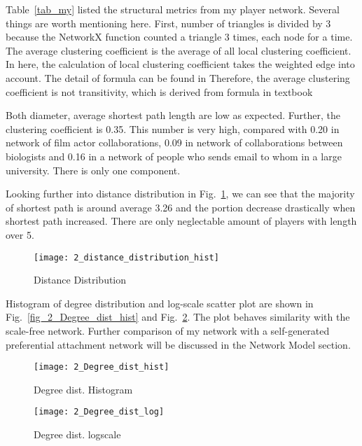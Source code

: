 \documentclass[runningheads]{llncs}
\begin{document}
Table~\ref{tab_my} listed the structural metrics from my player network.
 Several things are worth mentioning here. First, number of  triangles is divided by 3 because the NetworkX function counted a triangle 3 times, each node for a time. The average clustering coefficient is the average of all local clustering coefficient. In here, the calculation of local clustering coefficient takes the weighted edge into account. The detail of formula can be found in \cite{ref_url_cluster_coeff} Therefore, the average clustering coefficient is not transitivity, which is derived from formula in textbook

Both diameter, average shortest path length are low as expected. Further, the clustering coefficient is 0.35. This number is very high, compared with 0.20 in network of film actor collaborations, 0.09 in network of collaborations between biologists and 0.16 in a network of people who sends email to whom in a large university. There is only one component.

Looking further into distance distribution in Fig.~\ref{fig_2_distance_distribution_hist}, we can see that the majority of shortest path is around average 3.26 and the portion decrease drastically when shortest path increased. There are only neglectable amount of players with length over 5.

\begin{figure}[H]
\centering
\texttt{[image: 2\_distance\_distribution\_hist]}
\caption{Distance Distribution} \label{fig_2_distance_distribution_hist}
\end{figure}


Histogram of degree distribution and log-scale scatter plot are shown in  Fig.~\ref{fig_2_Degree_dist_hist} and Fig.~\ref{fig_2_Degree_dist_log}. The plot behaves similarity with the scale-free network. Further comparison of my network with  a self-generated preferential attachment network will be discussed in the Network Model
 section. 
 
 \begin{figure}
    \centering
    \begin{minipage}{0.5\textwidth}
        \centering
        \texttt{[image: 2\_Degree\_dist\_hist]} %
        \caption{Degree dist. Histogram}
        \label{fig_2_Degree_dist_hist}
    \end{minipage}\hfill
    \begin{minipage}{0.5\textwidth}
        \centering
        \texttt{[image: 2\_Degree\_dist\_log]} %
        \caption{Degree dist. logscale}
        \label{fig_2_Degree_dist_log}
    \end{minipage}
\end{figure}
 
\end{document}
